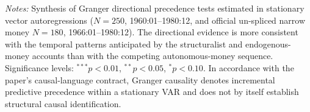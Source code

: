 \begin{table}[htbp]
{\begin{tabularx}{1.15\textwidth}{llXX>{\RaggedRight}X}
\end{tabularx}%
}
\begin{minipage}{0.96\textwidth}
\vspace{0.3em}
\footnotesize \textit{Notes:} Synthesis of Granger directional precedence tests estimated in stationary vector autoregressions ($N=250$, 1960:01--1980:12, and official un-spliced narrow money $N=180$, 1966:01--1980:12). The directional evidence is more consistent with the temporal patterns anticipated by the structuralist and endogenous-money accounts than with the competing autonomous-money sequence. Significance levels: $^{***} p < 0.01$, $^{**} p < 0.05$, $^{*} p < 0.10$. In accordance with the paper's causal-language contract, Granger causality denotes incremental predictive precedence within a stationary VAR and does not by itself establish structural causal identification.
\end{minipage}
\end{table}
